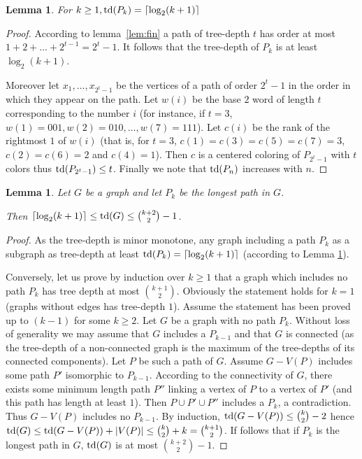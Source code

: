 \documentclass[a4paper]{amsart}
\newtheorem{lemma}[theorem]{Lemma}
\theoremstyle{definition}
\theoremstyle{remark}
\DeclareMathOperator\depth{{\rm td}}
\newcommand{\card}[1]{\lvert{#1}\rvert}
\begin{document}
\begin{lemma}
\label{lem:td_path}
For $k\geq 1, \depth(P_k)=\lceil\log_2 (k+1)\rceil$
\end{lemma}
\begin{proof}
According to 
lemma~\ref{lem:fin} a path of
tree-depth $t$ has order at most $1+2+\dots+2^{t-1}=2^t-1$. It follows that
the tree-depth of $P_k$ is at least $\log_2(k+1)$.

Moreover let $x_1,\dots,x_{2^t-1}$ be the vertices of a path of order
$2^t-1$ in the order in which they appear on the path. Let $w(i)$
be the base $2$ word of length $t$ corresponding to the number $i$ 
(for instance, if $t=3$, $w(1)=001, w(2)=010, \dots, w(7)=111$).
Let $c(i)$ be the rank of the rightmost $1$ of $w(i)$ (that is, for $t=3$,
$c(1)=c(3)=c(5)=c(7)=3$, $c(2)=c(6)=2$ and $c(4)=1$). Then $c$ is a
centered coloring of $P_{2^t-1}$ with $t$ colors thus
$\depth(P_{2^t-1})\leq t$. Finally we note that
 $\depth(P_n)$ increases with $n$.
\end{proof}

\begin{lemma}
\label{lem:path}
Let $G$ be a graph and let $P_k$ be the longest path in
$G$.

Then $\lceil\log_2 (k+1)\rceil\leq \depth(G)\leq \binom{k+2}{2}-1$.
\end{lemma}
\begin{proof}
 As the tree-depth is minor monotone, any graph including a path $P_k$
as a subgraph as 
tree-depth at least $\depth(P_k)=\lceil\log_2 (k+1)\rceil$ (according
to Lemma \ref{lem:td_path}).

Conversely, let us prove by induction over $k\geq 1$ that a graph which
includes no path $P_k$ has tree depth at most
$\binom{k+1}{2}$. Obviously the statement holds for $k=1$
(graphs without edges has tree-depth $1$). Assume the statement has
been proved up to $(k-1)$ for some $k\geq 2$. Let $G$ be a graph with
no path $P_k$. Without loss of generality we may assume
that $G$ includes a $P_{k-1}$ and that $G$ is connected
(as the tree-depth of a non-connected graph is the maximum of the
tree-depths of its connected components). Let $P$ be such a path of
$G$. Assume $G-V(P)$ includes some path $P'$ isomorphic to $P_{k-1}$. According
to the connectivity of $G$, there exists some minimum length path
$P''$ linking a vertex of $P$ to a vertex of $P'$ (and this path has
length at least $1$). Then $P\cup P'\cup P''$ includes a $P_k$, a
contradiction. 
Thus $G-V(P)$ includes no
$P_{k-1}$. By induction, $\depth(G-V(P))\leq\binom{k}{2}-2$
hence $\depth(G)\leq \depth(G-V(P))+\card{V(P)}\leq
\binom{k}{2}+k=\binom{k+1}{2}$. If follows that if $P_k$ is the longest
path in $G$, $\depth(G)$ is at most $\binom{k+2}{2}-1$.
\end{proof}
\end{document}
